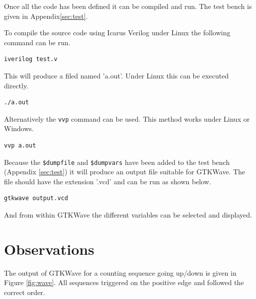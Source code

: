 \documentclass[12pt]{article}
\begin{document}
Once all the code has been defined it can be compiled and run.
The test bench is given in Appendix\ref{sec:test}.

To compile the source code using Icarus Verilog\cite{VERILOG}
under Linux the following command can be run.

\begin{verbatim}
iverilog test.v
\end{verbatim}

This will produce a filed named 'a.out'.
Under Linux this can be executed directly.

\begin{verbatim}
./a.out
\end{verbatim}

Alternatively the \verb+vvp+ command can be used.
This method works under Linux or Windows.

\begin{verbatim}
vvp a.out
\end{verbatim}

Because the \verb+$dumpfile+ and \verb+$dumpvars+ have been
added to the test bench (Appendix \ref{sec:test})
it will produce an output file suitable for GTKWave\cite{GTKWAVE}.
The file should have the extension '.vcd' and can
be run as shown below.

\begin{verbatim}
gtkwave output.vcd
\end{verbatim}

And from within GTKWave the different variables can be selected
and displayed.



\section{Observations}

The output of GTKWave for a counting sequence going up/down is
given in Figure \ref{fig:wave}.
All sequences triggered on the positive edge and followed the
correct order.
\end{document}
